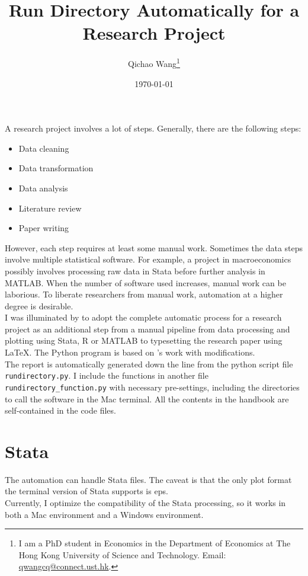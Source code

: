 \documentclass[12pt, a4paper]{article}
\title{Run Directory Automatically for a Research Project}
\author{Qichao Wang\thanks{I am a PhD student in Economics in the Department of Economics at The Hong Kong University of Science and Technology. Email: \href{mailto:qwangcq@connect.ust.hk}{qwangcq@connect.ust.hk}.}}
\date{\today}
\begin{document}
\maketitle

A research project involves a lot of steps. Generally, there are the following steps:
\begin{itemize}
	\item Data cleaning
	\item Data transformation
	\item Data analysis
	\item Literature review
	\item Paper writing
\end{itemize}
However, each step requires at least some manual work. Sometimes the data steps involve multiple statistical software. For example, a project in macroeconomics possibly involves processing raw data in Stata before further analysis in MATLAB. When the number of software used increases, manual work can be laborious. To liberate researchers from manual work, automation at a higher degree is desirable.\\

I was illuminated by \textcite{gentzkow_code_2014} to adopt the complete automatic process for a research project as an additional step from a manual pipeline from data processing and plotting using Stata, R or MATLAB to typesetting the research paper using \LaTeX. The Python program is based on \textcite{hofman_github_2018}'s work with modifications.\\

The report is automatically generated down the line from the python script file \texttt{rundirectory.py}. I include the functions in another file \texttt{rundirectory\_function.py} with necessary pre-settings, including the directories to call the software in the Mac terminal. All the contents in the handbook are self-contained in the code files.\\

\section{Stata}

The automation can handle Stata files. The caveat is that the only plot format the terminal version of Stata supports is eps.\\

Currently, I optimize the compatibility of the Stata processing, so it works in both a Mac environment and a Windows environment.\\
\end{document}
